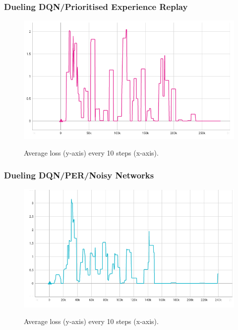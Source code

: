 \documentclass[12pt,a4paper]{article}
\begin{document}
    \subsubsection{Dueling DQN/Prioritised Experience Replay}
    \begin{figure}[H]
        \caption[Losses for Dueling DQN with PER.]{Average loss (y-axis) every 10 steps (x-axis).}
        \centering
        \includegraphics[scale=0.5]{losses_ddqn_per}
        \label{fig:losses_ddqn_per}
    \end{figure}
    \subsubsection{Dueling DQN/PER/Noisy Networks}
    \begin{figure}[H]
        \caption[Losses for Dueling DQN with PER and NN.]{Average loss (y-axis) every 10 steps (x-axis).}
        \centering
        \includegraphics[scale=0.5]{losses_ddqn_noisy}
        \label{fig:losses_ddqn_noisy}
    \end{figure}
\end{document}
